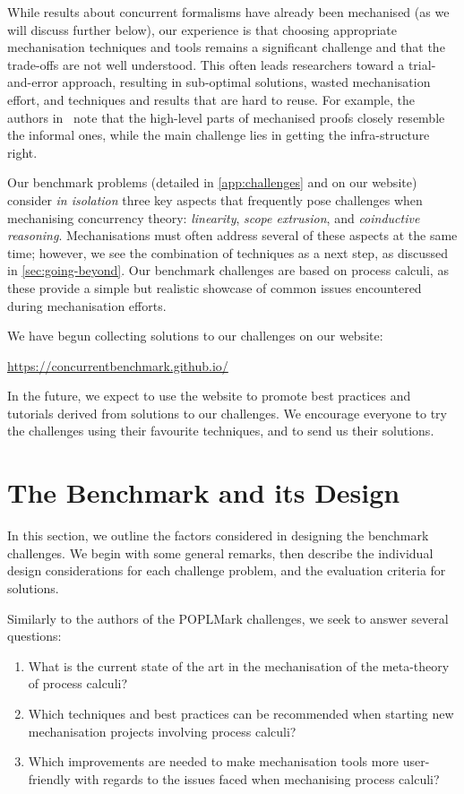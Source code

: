 \documentclass[runningheads]{llncs}
\begin{document}
While results about concurrent
formalisms have already been mechanised (as we will discuss further
below), our experience is that choosing appropriate mechanisation
techniques and tools remains a significant challenge and that the
trade-offs are not well understood.  This often leads researchers
toward a trial-and-error approach, resulting in sub-optimal solutions,
wasted mechanisation effort, and techniques and results that are hard
to reuse. For example, the authors in~\cite{Cruz-Filipe2021b} note that the high-level parts of
mechanised proofs closely resemble the informal ones, while the
main challenge lies in getting the infra-structure right.

Our benchmark problems (detailed in \cref{app:challenges} and on our website) consider
\emph{in isolation} three key aspects that frequently pose challenges
when mechanising concurrency theory: \emph{linearity}, \emph{scope
  extrusion}, and \emph{coinductive reasoning}.  Mechanisations must
often address several of these aspects at the same time; however, we
see the combination of techniques as a next
step, as discussed in \cref{sec:going-beyond}.
Our benchmark challenges are based on process calculi, as these provide a simple but
realistic showcase of common issues encountered during mechanisation
efforts.

We have begun collecting solutions to our challenges on our website:
%
\begin{center}
  \url{https://concurrentbenchmark.github.io/}
\end{center}
%
In the future, we expect to use the website to promote best practices and tutorials derived from solutions to our challenges.
We encourage everyone to try the challenges using their favourite techniques, and to send us their solutions.

\section{The Benchmark and its Design}\label{sec:design-discussion}
In this section, we outline the factors considered in designing the benchmark challenges.
We begin with some general remarks, then describe the individual design considerations for each challenge problem, and the evaluation criteria for solutions.

Similarly to the authors of the POPLMark challenges, we seek to answer several questions:
\begin{enumerate}[label=\textbf{(Q\arabic*)},leftmargin=10mm]
\item\label{item:rq1} What is the current state of the art in the mechanisation of  the meta-theory of process calculi?
\item\label{item:rq2} Which techniques and best practices can be recommended when starting new mechanisation projects involving process calculi?
\item\label{item:rq3} Which improvements are needed to make mechanisation tools more user-friendly with regards to the issues faced when mechanising process calculi?
\end{enumerate}
\end{document}
